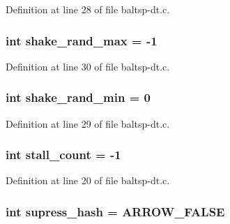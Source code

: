 Definition at line 28 of file baltsp-dt.c.\hypertarget{bin_2baltsp-dt_8c_bcacd5fab89a9f3eaab5401c5001b4c5}{
\subsubsection[{shake\_\-rand\_\-max}]{\setlength{\rightskip}{0pt plus 5cm}int {\bf shake\_\-rand\_\-max} = -1}}
\label{bin_2baltsp-dt_8c_bcacd5fab89a9f3eaab5401c5001b4c5}




Definition at line 30 of file baltsp-dt.c.\hypertarget{bin_2baltsp-dt_8c_b7fc57ece1162e77f74b4803961b72cb}{
\subsubsection[{shake\_\-rand\_\-min}]{\setlength{\rightskip}{0pt plus 5cm}int {\bf shake\_\-rand\_\-min} = 0}}
\label{bin_2baltsp-dt_8c_b7fc57ece1162e77f74b4803961b72cb}




Definition at line 29 of file baltsp-dt.c.\hypertarget{bin_2baltsp-dt_8c_a1641a28cf3ea572a56763e84518c17b}{
\subsubsection[{stall\_\-count}]{\setlength{\rightskip}{0pt plus 5cm}int {\bf stall\_\-count} = -1}}
\label{bin_2baltsp-dt_8c_a1641a28cf3ea572a56763e84518c17b}




Definition at line 20 of file baltsp-dt.c.\hypertarget{bin_2baltsp-dt_8c_c022145e682345ed4064bad274e5a4f1}{
\subsubsection[{supress\_\-hash}]{\setlength{\rightskip}{0pt plus 5cm}int {\bf supress\_\-hash} = ARROW\_\-FALSE}}
\label{bin_2baltsp-dt_8c_c022145e682345ed4064bad274e5a4f1}




